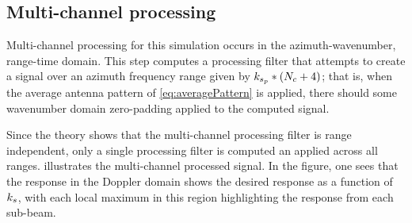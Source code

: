 \subsection{Multi-channel processing}
Multi-channel processing for this simulation occurs in the azimuth-wavenumber, range-time domain. This step computes a processing filter that attempts to create a signal over an azimuth frequency range given by $k_{s_p}*(N_c + 4)$; that is, when the average antenna pattern of \eqref{eq:averagePattern} is applied, there should some wavenumber domain zero-padding applied to the computed signal.
\par
Since the theory shows that the multi-channel processing filter is range independent, only a single processing filter is computed an applied across all ranges.  illustrates the multi-channel processed signal. In the figure, one sees that the response in the Doppler domain shows the desired response as a function of $k_{s}$, with each local maximum in this region highlighting the response from each sub-beam.
